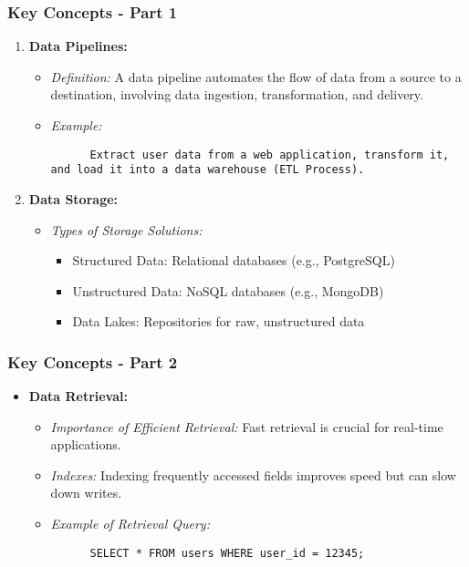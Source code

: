 \documentclass[aspectratio=169]{beamer}
\begin{document}
\begin{frame}[fragile]
  \frametitle{Key Concepts - Part 1}
  \begin{enumerate}
    \item \textbf{Data Pipelines:}
    \begin{itemize}
      \item \textit{Definition:} A data pipeline automates the flow of data from a source to a destination, involving data ingestion, transformation, and delivery.
      \item \textit{Example:} 
      \begin{lstlisting}
      Extract user data from a web application, transform it, and load it into a data warehouse (ETL Process).
      \end{lstlisting}
    \end{itemize}
    
    \item \textbf{Data Storage:}
    \begin{itemize}
      \item \textit{Types of Storage Solutions:}
      \begin{itemize}
        \item Structured Data: Relational databases (e.g., PostgreSQL)
        \item Unstructured Data: NoSQL databases (e.g., MongoDB)
        \item Data Lakes: Repositories for raw, unstructured data
      \end{itemize}
    \end{itemize}
  \end{enumerate}
\end{frame}

\begin{frame}[fragile]
  \frametitle{Key Concepts - Part 2}
  \begin{itemize}
    \item \textbf{Data Retrieval:}
    \begin{itemize}
      \item \textit{Importance of Efficient Retrieval:} Fast retrieval is crucial for real-time applications.
      \item \textit{Indexes:} Indexing frequently accessed fields improves speed but can slow down writes.
      \item \textit{Example of Retrieval Query:}
      \begin{lstlisting}
      SELECT * FROM users WHERE user_id = 12345;
      \end{lstlisting}
    \end{itemize}
  \end{itemize}
\end{frame}
\end{document}
